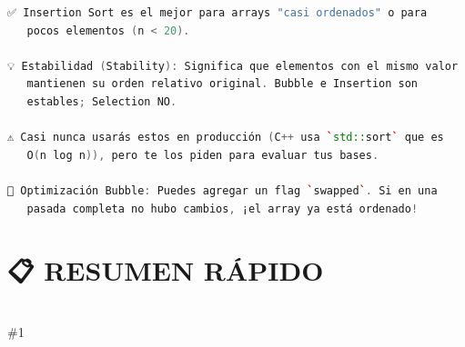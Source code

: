 \documentclass{article}
\newcommand{\resumen}[1]{
    \section*{📋 RESUMEN RÁPIDO}
    \hrulefill \\
    \#1
}
\begin{document}
\begin{lstlisting}[language=C++]
✅ Insertion Sort es el mejor para arrays "casi ordenados" o para 
   pocos elementos (n < 20).

💡 Estabilidad (Stability): Significa que elementos con el mismo valor
   mantienen su orden relativo original. Bubble e Insertion son 
   estables; Selection NO.

⚠️ Casi nunca usarás estos en producción (C++ usa `std::sort` que es 
   O(n log n)), pero te los piden para evaluar tus bases.

🔑 Optimización Bubble: Puedes agregar un flag `swapped`. Si en una
   pasada completa no hubo cambios, ¡el array ya está ordenado!
\end{lstlisting}

\resumen{
• Los 3 son O(n^2) en el peor caso.
• Bubble: El más sencillo e ineficiente.
• Insertion: El mejor para casos pequeños o casi listos.
• Selection: Hace el mínimo de swaps posibles (útil si escribir en 
  memoria es muy caro).
• In-place: No necesitan memoria extra.
════════════════════════════════════════════════════════════════
}
\end{document}
